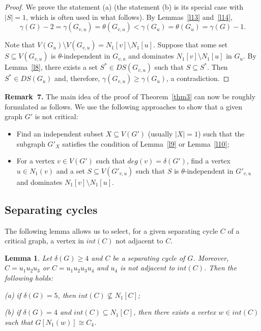 \documentclass[12pt]{article}
\newtheorem{lemma}{Lemma}
\begin{document}
\begin{proof}
We prove the statement (a) (the statement (b) is its special case with $|S| = 1$, which is often used in what follows). By Lemmas~\ref{l13} and~\ref{l14},
$$\gamma(G) - 2 = \gamma(G_{v,u}) = \theta(G_{v,u}) < \gamma(G_u) = \theta(G_u) = \gamma(G) - 1.$$

Note that $V(G_u) \setminus V(G_{v,u}) = N_1[v] \setminus N_1[u]$. Suppose that some set $S \subseteq V(G_{v,u})$ is $\theta$-independent in $G_{v,u}$ and dominates $N_1[v] \setminus N_1[u]$ in $G_u$. By Lemma~\ref{l8}, there exists a set $S^* \in DS(G_{v,u})$ such that $S \subseteq S^*$. Then $S^* \in DS(G_u)$ and, therefore, $\gamma(G_{v,u}) \geq \gamma(G_u)$, a contradiction.
\end{proof}

\textbf{Remark~7.} The main idea of the proof of Theorem~\ref{thm3} can now be roughly formulated as follows. We use the following approaches to show that a given graph $G'$ is not critical:
\begin{itemize}
\item Find an independent subset $X \subseteq V(G')$ (usually $|X| = 1$)  such that the subgraph $G'_X$ satisfies the condition of Lemma~\ref{l9} or Lemma~\ref{l10};

\item For a vertex $v \in V(G')$ such that $deg(v) = \delta(G')$, find a vertex $u \in N_1(v)$ and a set $S \subseteq V(G'_{v,u})$ such that $S$ is $\theta$-independent in $G'_{v,u}$ and dominates $N_1[v] \setminus N_1[u]$.
\end{itemize}

\subsection{Separating cycles}\label{s42}

The following lemma allows us to select, for a given separating cycle $C$ of a critical graph, a vertex in $int(C)$ not adjacent to $C$.

\begin{lemma}\label{l15}
Let $\delta(G) \geq 4$ and $C$ be a separating cycle of $G$. Moreover, $C = u_1u_2u_3$ or $C = u_1u_2u_3u_4$ and $u_4$ is not adjacent to $int(C)$. Then the following holds:

(a) if $\delta(G) = 5$, then $int(C) \nsubseteq N_1[C]$; 

(b) if $\delta(G) = 4$ and $int(C) \subseteq N_1[C]$, then there exists a vertex $w \in int(C)$ such that $G[N_1(w)] \cong C_4$. 
\end{lemma}
\end{document}
